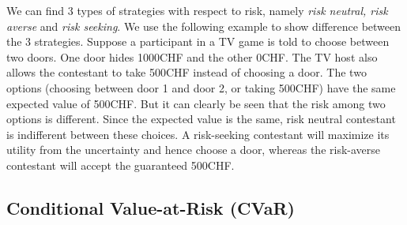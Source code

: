 We can find 3 types of strategies with respect to risk, namely \textit{risk neutral, risk averse} and \textit{risk seeking}.
We use the following example to show difference between the 3 strategies. Suppose a participant in a TV game is told to choose between two doors.
One door hides 1000CHF and the other 0CHF. The TV host also allows the contestant to 
take 500CHF instead of choosing a door. The two options (choosing between door 1 and door 2, or taking 500CHF)
have the same expected value of 500CHF. But it can clearly be seen that the risk among two options is different.
Since the expected value is the same, risk neutral contestant is indifferent between these choices.
A risk-seeking contestant will maximize its utility from the uncertainty and hence choose a door,
whereas the risk-averse contestant  will accept the guaranteed 500CHF.


\subsection{Conditional Value-at-Risk (CVaR)}

